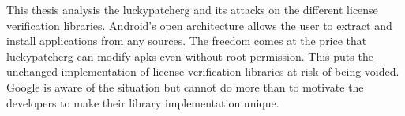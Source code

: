 This thesis analysis the \gls{luckypatcherg} and its attacks on the different license verification libraries.
Android's open architecture allows the user to extract and install applications from any sources.
The freedom comes at the price that \gls{luckypatcherg} can modify \gls{apk}s even without root permission.
This puts the unchanged implementation of license verification libraries at risk of being voided.
\newline
Google is aware of the situation but cannot do more than to motivate the developers to make their library implementation unique.
